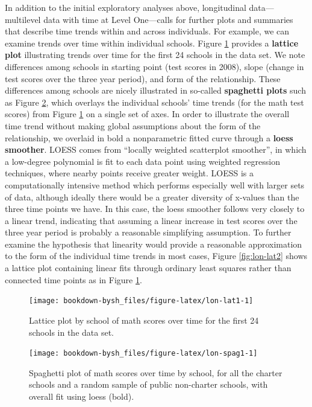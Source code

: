 \documentclass[
]{krantz}
\begin{document}
In addition to the initial exploratory analyses above, longitudinal data---multilevel data with time at Level One---calls for further plots and summaries that describe time trends within and across individuals. For example, we can examine trends over time within individual schools. Figure \ref{fig:lon-lat1} provides a \textbf{lattice plot} illustrating trends over time for the first 24 schools in the data set. We note differences among schools in starting point (test scores in 2008), slope (change in test scores over the three year period), and form of the relationship. These differences among schools are nicely illustrated in so-called \textbf{spaghetti plots} such as Figure \ref{fig:lon-spag1}, which overlays the individual schools' time trends (for the math test scores) from Figure \ref{fig:lon-lat1} on a single set of axes. In order to illustrate the overall time trend without making global assumptions about the form of the relationship, we overlaid in bold a nonparametric fitted curve through a \textbf{loess smoother}. LOESS comes from ``locally weighted scatterplot smoother'', in which a low-degree polynomial is fit to each data point using weighted regression techniques, where nearby points receive greater weight. LOESS is a computationally intensive method which performs especially well with larger sets of data, although ideally there would be a greater diversity of x-values than the three time points we have. In this case, the loess smoother follows very closely to a linear trend, indicating that assuming a linear increase in test scores over the three year period is probably a reasonable simplifying assumption. To further examine the hypothesis that linearity would provide a reasonable approximation to the form of the individual time trends in most cases, Figure \ref{fig:lon-lat2} shows a lattice plot containing linear fits through ordinary least squares rather than connected time points as in Figure \ref{fig:lon-lat1}.

\begin{figure}

{\centering \texttt{[image: bookdown-bysh\_files/figure-latex/lon-lat1-1]} 

}

\caption{Lattice plot by school of math scores over time for the first 24 schools in the data set.}\label{fig:lon-lat1}
\end{figure}

\begin{figure}

{\centering \texttt{[image: bookdown-bysh\_files/figure-latex/lon-spag1-1]} 

}

\caption{ Spaghetti plot of math scores over time by school, for all the charter schools and a random sample of public non-charter schools, with overall fit using loess (bold).}\label{fig:lon-spag1}
\end{figure}
\end{document}
